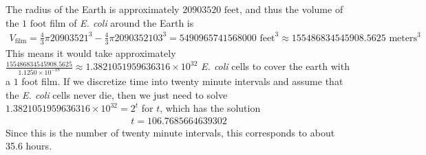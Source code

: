 \documentclass{article} %
\theoremstyle{plain}
\numberwithin{equation}{section} %
\numberwithin{figure}{section} %
\numberwithin{table}{section} %
\begin{document}
The radius of the Earth is approximately $20903520 \text{ feet}$, and thus the volume of the $1 \text{ foot}$ film of \emph{E. coli} around the Earth is
\begin{align*}
    V_{\text{film}} = \frac{4}{3}\pi 20903521^3 - \frac{4}{3}\pi 2090352103^3 = 5490965741568000 \text{ feet}^3 \approx 155486834545908.5625 \text{ meters}^3
\end{align*}
This means it would take approximately $\frac{155486834545908.5625}{1.1250\times10^{-18}} \approx 1.3821051959636316\times 10^{32}$ \emph{E. coli} cells to cover the earth with a $1$ foot film.  If we discretize time into twenty minute intervals and assume that the \emph{E. coli} cells never die, then we just need to solve $1.3821051959636316\times 10^{32} = 2^t$ for $t$, which has the solution
\begin{align*}
    t = 106.7685664639302
\end{align*}
Since this is the number of twenty minute intervals, this corresponds to about 35.6 hours.
\end{document}
